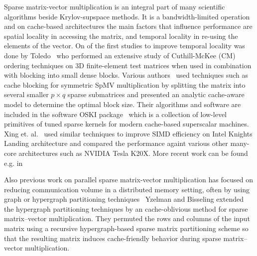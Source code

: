 Sparse matrix-vector multiplication is an integral part of many scientific algorithms beside Krylov-supspace methods. It is a bandwidth-limited operation and on cache-based architectures the main factors that influence performance are spatial locality in accessing the matrix, and temporal locality in re-using the elements of the vector. On of the first studies to improve  temporal locality was done by Toledo~\cite{Toledo:1997:IMP:279511.279532} who performed an extensive study of Cuthill-McKee (CM) ordering techniques on 3D finite-element test matrices when used in combination with blocking into small dense blocks. Various authors~\cite{Buluc:2011:RMA:2058524.2059503,Williams:2009:OSM:1513001.1513318,doi:10.1177/1094342004041296} used techniques such as cache blocking for symmetric SpMV multiplication by splitting the matrix into several smaller $p \times q$ sparse submatrices and presented an analytic cache-aware model to determine the optimal block size. Their algorithms and software are included in the software OSKI package~\cite{1742-6596-16-1-071} which is a collection of low-level primitives of tuned sparse kernels for modern cache-based superscalar machines.
Xing et. al.~\cite{Liu:2013:ESM:2464996.2465013} used similar techniques to improve SIMD efficiency on Intel Knights Landing architecture
and compared the performance againt various other many-core architectures such as NVIDIA Tesla K20X. More recent work can be found e.g. in~\cite{Buluc:2011:RMA:2058524.2059503}

Also previous work on parallel sparse matrix-vector multiplication has focused on reducing communication volume in a distributed memory setting, often by using graph or hypergraph partitioning techniques~\cite{Catalyurek:1999} Yzelman and Bisseling \cite{doi:10.1137/080733243,Yzelman-thesis-2011} extended the  hypergraph partitioning techniques by an cache-oblivious method for sparse matrix–vector multiplication. They permuted the rows and columns of the input matrix using a recursive hypergraph-based sparse matrix partitioning scheme so that the resulting matrix induces cache-friendly behavior during sparse matrix–vector multiplication.



